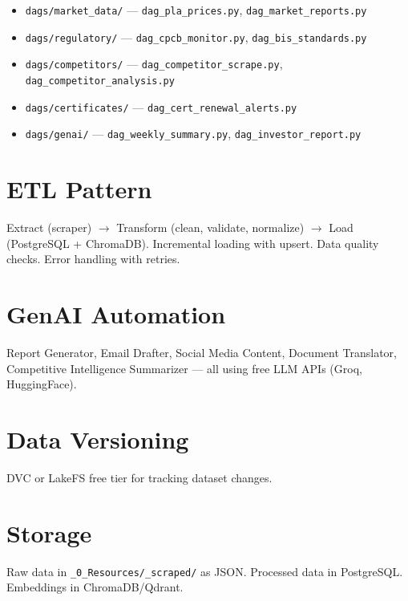 \documentclass{article}
\begin{document}
\begin{itemize}[leftmargin=*]
  \item \texttt{dags/market\_data/} --- \texttt{dag\_pla\_prices.py}, \texttt{dag\_market\_reports.py}
  \item \texttt{dags/regulatory/} --- \texttt{dag\_cpcb\_monitor.py}, \texttt{dag\_bis\_standards.py}
  \item \texttt{dags/competitors/} --- \texttt{dag\_competitor\_scrape.py}, \texttt{dag\_competitor\_analysis.py}
  \item \texttt{dags/certificates/} --- \texttt{dag\_cert\_renewal\_alerts.py}
  \item \texttt{dags/genai/} --- \texttt{dag\_weekly\_summary.py}, \texttt{dag\_investor\_report.py}
\end{itemize}

\section{ETL Pattern}

Extract (scraper) $\rightarrow$ Transform (clean, validate, normalize) $\rightarrow$ Load (PostgreSQL + ChromaDB). Incremental loading with upsert. Data quality checks. Error handling with retries.

\section{GenAI Automation}

Report Generator, Email Drafter, Social Media Content, Document Translator, Competitive Intelligence Summarizer --- all using free LLM APIs (Groq, HuggingFace).

\section{Data Versioning}

DVC or LakeFS free tier for tracking dataset changes.

\section{Storage}

Raw data in \texttt{\_0\_Resources/\_scraped/} as JSON. Processed data in PostgreSQL. Embeddings in ChromaDB/Qdrant.
\end{document}
